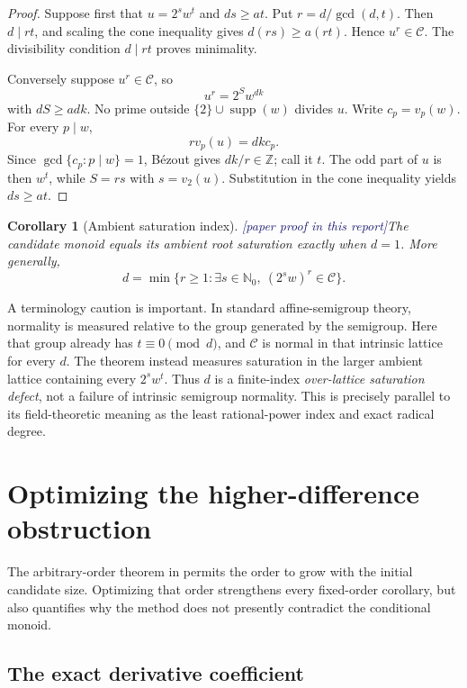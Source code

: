 \documentclass[11pt,oneside]{article}
\newtheorem{corollary}[theorem]{Corollary}
\theoremstyle{definition}
\newcommand{\Nzero}{\mathbb N_0}
\newcommand{\Z}{\mathbb Z}
\newcommand{\Cand}{\mathcal C}
\newcommand{\supp}{\operatorname{supp}}
\newcommand{\tagPaper}{\textcolor{MidnightBlue}{\textsf{[paper proof in this report]}}}
\newcommand{\lean}[1]{\texttt{\detokenize{#1}}}
\begin{document}
\begin{proof}
Suppose first that \(u=2^sw^t\) and \(ds\ge at\).  Put
\(r=d/\gcd(d,t)\).  Then \(d\mid rt\), and scaling the cone inequality gives
\(d(rs)\ge a(rt)\).  Hence \(u^r\in\Cand\).  The divisibility condition
\(d\mid rt\) proves minimality.

Conversely suppose \(u^r\in\Cand\), so
\[
  u^r=2^Sw^{dk}
\]
with \(dS\ge adk\).  No prime outside \(\{2\}\cup\supp(w)\) divides \(u\).  Write
\(c_p=v_p(w)\).  For every \(p\mid w\),
\[
  r v_p(u)=dkc_p.
\]
Since \(\gcd\{c_p:p\mid w\}=1\), B\'ezout gives \(dk/r\in\Z\); call it \(t\).
The odd part of \(u\) is then \(w^t\), while \(S=rs\) with \(s=v_2(u)\).  Substitution
in the cone inequality yields \(ds\ge at\).
\end{proof}

\begin{corollary}[Ambient saturation index]\label{cor:ambient-index}
\tagPaper The candidate monoid equals its ambient root saturation exactly when \(d=1\).
More generally,
\[
  d=\min\{r\ge1:\exists s\in\Nzero,\ (2^sw)^r\in\Cand\}.
\]
\end{corollary}

A terminology caution is important.  In standard affine-semigroup theory, normality is
measured relative to the group generated by the semigroup.  Here that group already has
\(t\equiv0\pmod d\), and \(\Cand\) is normal in that intrinsic lattice for every \(d\).
The theorem instead measures saturation in the larger ambient lattice containing every
\(2^sw^t\).  Thus \(d\) is a finite-index \emph{over-lattice saturation defect}, not a
failure of intrinsic semigroup normality.  This is precisely parallel to its field-theoretic
meaning as the least rational-power index and exact radical degree.

\section{Optimizing the higher-difference obstruction}\label{sec:finite-difference}

The arbitrary-order theorem in \lean{HigherDifference.lean} permits the order to grow with
the initial candidate size.  Optimizing that order strengthens every fixed-order corollary,
but also quantifies why the method does not presently contradict the conditional monoid.

\subsection{The exact derivative coefficient}
\end{document}
